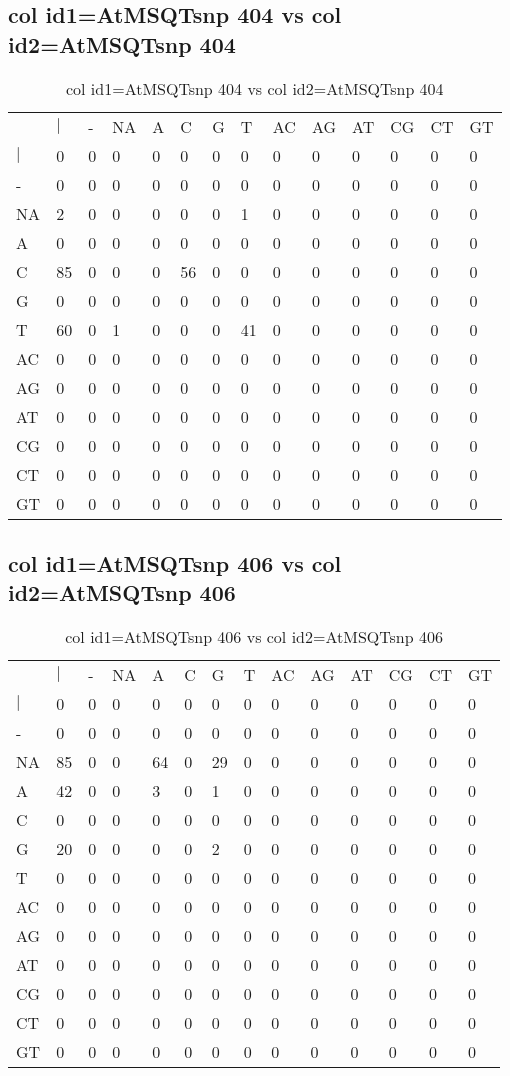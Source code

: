 \subsection{col id1=AtMSQTsnp 404 vs col id2=AtMSQTsnp 404}
\begin{center}
\begin{longtable}{|l|l|l|l|l|l|l|l|l|l|l|l|l|l|}
\caption{col id1=AtMSQTsnp 404 vs col id2=AtMSQTsnp 404} \label{table_dm726}\\
\hline
\\
\hline
&$|$&-&NA&A&C&G&T&AC&AG&AT&CG&CT&GT\\
$|$&0&0&0&0&0&0&0&0&0&0&0&0&0\\
-&0&0&0&0&0&0&0&0&0&0&0&0&0\\
NA&2&0&0&0&0&0&1&0&0&0&0&0&0\\
A&0&0&0&0&0&0&0&0&0&0&0&0&0\\
C&85&0&0&0&56&0&0&0&0&0&0&0&0\\
G&0&0&0&0&0&0&0&0&0&0&0&0&0\\
T&60&0&1&0&0&0&41&0&0&0&0&0&0\\
AC&0&0&0&0&0&0&0&0&0&0&0&0&0\\
AG&0&0&0&0&0&0&0&0&0&0&0&0&0\\
AT&0&0&0&0&0&0&0&0&0&0&0&0&0\\
CG&0&0&0&0&0&0&0&0&0&0&0&0&0\\
CT&0&0&0&0&0&0&0&0&0&0&0&0&0\\
GT&0&0&0&0&0&0&0&0&0&0&0&0&0\\
\hline
\end{longtable}
\end{center}

\subsection{col id1=AtMSQTsnp 406 vs col id2=AtMSQTsnp 406}
\begin{center}
\begin{longtable}{|l|l|l|l|l|l|l|l|l|l|l|l|l|l|}
\caption{col id1=AtMSQTsnp 406 vs col id2=AtMSQTsnp 406} \label{table_dm728}\\
\hline
\\
\hline
&$|$&-&NA&A&C&G&T&AC&AG&AT&CG&CT&GT\\
$|$&0&0&0&0&0&0&0&0&0&0&0&0&0\\
-&0&0&0&0&0&0&0&0&0&0&0&0&0\\
NA&85&0&0&64&0&29&0&0&0&0&0&0&0\\
A&42&0&0&3&0&1&0&0&0&0&0&0&0\\
C&0&0&0&0&0&0&0&0&0&0&0&0&0\\
G&20&0&0&0&0&2&0&0&0&0&0&0&0\\
T&0&0&0&0&0&0&0&0&0&0&0&0&0\\
AC&0&0&0&0&0&0&0&0&0&0&0&0&0\\
AG&0&0&0&0&0&0&0&0&0&0&0&0&0\\
AT&0&0&0&0&0&0&0&0&0&0&0&0&0\\
CG&0&0&0&0&0&0&0&0&0&0&0&0&0\\
CT&0&0&0&0&0&0&0&0&0&0&0&0&0\\
GT&0&0&0&0&0&0&0&0&0&0&0&0&0\\
\hline
\end{longtable}
\end{center}

